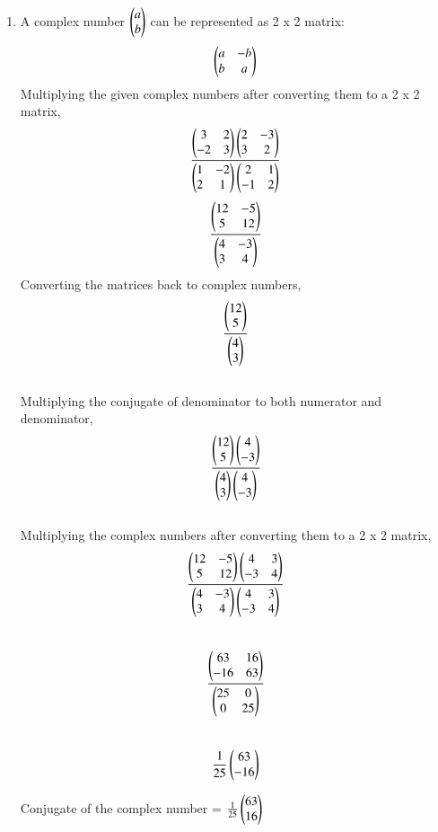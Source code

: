 \renewcommand{\theequation}{\theenumi}
\begin{enumerate}[label=\arabic*.,ref=\thesubsubsection.\theenumi]
%
\item A complex number $\begin{pmatrix}a\\b\end{pmatrix}$ can be represented as 2 x 2 matrix:
$$\begin{pmatrix}a & -b \\ b & a\end{pmatrix}$$
Multiplying the given complex numbers after converting them to a 2 x 2 matrix, \\
$$\frac{\begin{pmatrix}3 & 2\\-2 & 3 \end{pmatrix}\begin{pmatrix}2 & -3 \\3 & 2\end{pmatrix}}{\begin{pmatrix}1 & -2\\2 & 1\end{pmatrix}\begin{pmatrix}2 & 1\\-1 & 2\end{pmatrix}}$$
$$\frac{\begin{pmatrix}12 & -5\\5 & 12\end{pmatrix}}{\begin{pmatrix}4 & -3\\3 & 4\end{pmatrix}}$$
Converting the matrices back to complex numbers, 
$$\frac{\begin{pmatrix}12\\5\end{pmatrix}}{\begin{pmatrix}4\\3\end{pmatrix}}$$ \\
Multiplying the conjugate of denominator to both numerator and denominator,
$$\frac{\begin{pmatrix}12\\5\end{pmatrix}\begin{pmatrix}4\\-3\end{pmatrix}}{\begin{pmatrix}4\\3\end{pmatrix}\begin{pmatrix}4\\-3\end{pmatrix}}$$ \\
Multiplying the  complex numbers after converting them to a 2 x 2 matrix,
$$\frac{\begin{pmatrix}12 & -5\\5 & 12 \end{pmatrix}\begin{pmatrix}4 & 3 \\-3 & 4\end{pmatrix}}{\begin{pmatrix}4 & -3\\3 & 4\end{pmatrix}\begin{pmatrix}4 & 3\\-3 & 4\end{pmatrix}}$$ \\
$$\frac{\begin{pmatrix}63 & 16\\-16 & 63\end{pmatrix}}{\begin{pmatrix}25 & 0\\0 & 25\end{pmatrix}}$$ \\
$$\frac{1}{25}\begin{pmatrix}63 \\ -16\end{pmatrix} $$

Conjugate of the complex number = $\frac{1}{25}\begin{pmatrix}63 \\ 16\end{pmatrix}$

\end{enumerate}

